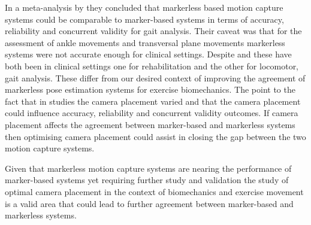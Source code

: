 In a meta-analysis by \citet{scataglini2024accuracy} they concluded that markerless based motion capture systems could be comparable to marker-based systems in terms of accuracy, reliability and concurrent validity for gait analysis. Their caveat was that for the assessment of ankle movements and transversal plane movements markerless systems were not accurate enough for clinical settings.
Despite \citet{outerleys2025clinical} and \citet{unger2025differentiable} these have both been in clinical settings one for rehabilitation and the other for locomotor, gait analysis. These differ from our desired context of improving the agreement of markerless pose estimation systems for exercise biomechanics.
The point to the fact that in studies the camera placement varied and that the camera placement could influence accuracy, reliability and concurrent validity outcomes. If camera placement affects the agreement between marker-based and markerless systems then optimising camera placement could assist in closing the gap between the two motion capture systems.

Given that markerless motion capture systems are nearing the performance of marker-based systems yet requiring further study and validation the study of optimal camera placement in the context of biomechanics and exercise movement is a valid area that could lead to further agreement between marker-based and markerless systems.



